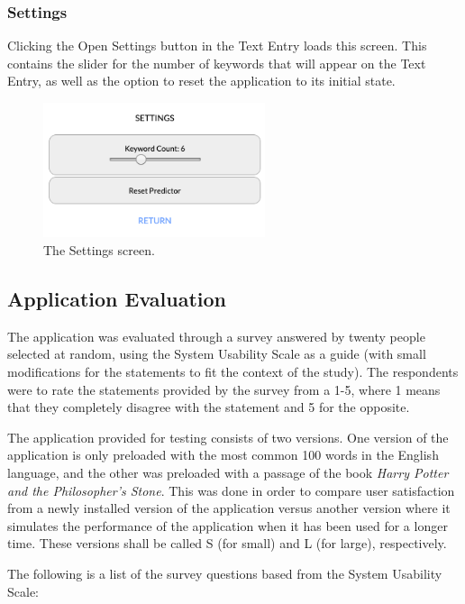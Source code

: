 \documentclass[journal]{./IEEE/IEEEtran}
\begin{document}
\subsubsection{Settings}
Clicking the Open Settings button in the Text Entry loads this screen. This contains the slider for the number of keywords that will appear on the Text Entry, as well as the option to reset the application to its initial state.

\begin{figure}[!ht]
\begin{center}

\includegraphics[width=65mm]{images/settings.png}
\caption{The Settings screen.}

\end{center}
\end{figure}

\subsection{Application Evaluation}
The application was evaluated through a survey answered by twenty people selected at random, using the System Usability Scale as a guide (with small modifications for the statements to fit the context of the study). The respondents were to rate the statements provided by the survey from a 1-5, where 1 means that they completely disagree with the statement and 5 for the opposite.

The application provided for testing consists of two versions. One version of the application is only preloaded with the most common 100 words in the English language, and the other was preloaded with a passage of the book \textit{Harry Potter and the Philosopher's Stone}. This was done in order to compare user satisfaction from a newly installed version of the application versus another version where it simulates the performance of the application when it has been used for a longer time. These versions shall be called S (for small) and L (for large), respectively.

The following is a list of the survey questions based from the System Usability Scale\cite{UsabilityGeeks}:
\end{document}
